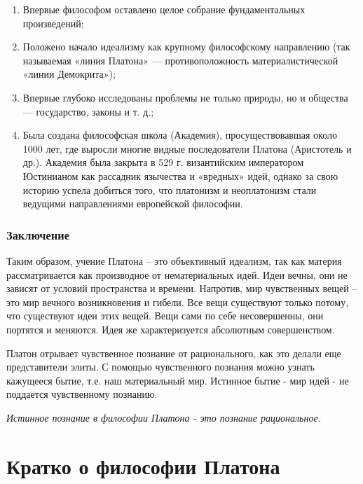 \documentclass[
]{article}
\begin{document}
\begin{enumerate}
\def\labelenumi{\arabic{enumi}.}
\item
  Впервые философом оставлено целое собрание фундамен­тальных
  произведений;
\item
  Положено начало идеализму как крупному философскому направлению (так
  называемая «линия Платона» --- противоположность материалистической
  «линии Демокрита»);
\item
  Впервые глубоко исследованы проблемы не только природы, но и общества
  --- государство, законы и т. д.;
\item
  Была создана философская школа (Академия), просуществовавшая около
  1000 лет, где выросли многие видные последователи Платона (Аристотель
  и др.). Академия была закрыта в 529 г. византийским императором
  Юстинианом как рассадник язычества и «вредных» идей, однако за свою
  историю успела добиться того, что платонизм и неоплатонизм стали
  ведущими направлениями европейской философии.
\end{enumerate}

\hypertarget{ux437ux430ux43aux43bux44eux447ux435ux43dux438ux435-3}{%
\subsubsection{Заключение}\label{ux437ux430ux43aux43bux44eux447ux435ux43dux438ux435-3}}

Таким образом, учение Платона -- это объективный идеализм, так как
материя рассматривается как производное от нематериальных идей. Идеи
вечны, они не зависят от условий пространства и времени. Напротив, мир
чувственных вещей -- это мир вечного возникновения и гибели. Все вещи
существуют только потому, что существуют идеи этих вещей. Вещи сами по
себе несовершенны, они портятся и меняются. Идея же характеризуется
абсолютным совершенством.

Платон отрывает чувственное познание от рационального, как это делали
еще представители элиты. С помощью чувственного познания можно узнать
кажущееся бытие, т.е. наш материальный мир. Истинное бытие - мир идей -
не поддается чувственному познанию.

\emph{Истинное познание в философии Платона - это познание
рациональное.}

\hypertarget{ux43aux440ux430ux442ux43aux43e-ux43e-ux444ux438ux43bux43eux441ux43eux444ux438ux438-ux43fux43bux430ux442ux43eux43dux430}{%
\section{Кратко о философии
Платона}\label{ux43aux440ux430ux442ux43aux43e-ux43e-ux444ux438ux43bux43eux441ux43eux444ux438ux438-ux43fux43bux430ux442ux43eux43dux430}}
\end{document}
